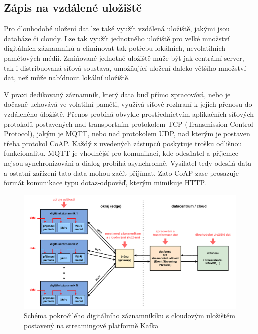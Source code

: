 \subsection{Zápis na vzdálené uložiště}
\label{zapis_na_vzdalene_uloziste}
Pro dlouhodobé uložení dat lze také využít vzdálená uložiště, jakými jsou databáze či cloudy. Lze tak využít jednotného uložiště pro velké množství digitálních záznamníků a eliminovat tak potřebu lokálních, nevolatilních paměťových médií. Zmiňované jednotné uložiště může být jak centrální server, tak i distribuovaná síťová soustava, umožňující uložení daleko většího množství dat, než může nabídnout lokální uložiště.

V praxi dedikovaný záznamník, který data buď přímo zpracovává, nebo je dočasně uchovává ve volatilní paměti, využívá síťové rozhraní k jejich přenosu do vzdáleného úložiště. Přenos probíhá obvykle prostřednictvím aplikačních síťových protokolů postavených nad transportním protokolem TCP (Transmission Control Protocol), jakým je MQTT, nebo nad protokolem UDP, nad kterým je postaven třeba protokol CoAP. Každý z uvedených zástupců poskytuje trošku odlišnou funkcionalitu. MQTT je vhodnější pro komunikaci, kde odesílatel a příjemce nejsou synchronizováni a dialog probíhá asynchronně. Vysílatel tedy odesílá data a ostatní zařízení tato data mohou začít přijímat. Zato CoAP zase prosazuje formát komunikace typu dotaz-odpověď, kterým mimikuje HTTP. \cite{emq_mqtt_vs_coap}


\begin{figure}[h]
    \centering
    \includegraphics[width=1.00\textwidth]{obrazky-figures/advanced_architecture_of_datalogging.pdf}
    
    \caption{Schéma pokročilého digitálního záznamníkíku s cloudovým uložištěm postavený na streamingové platformě Kafka \cite{confluent_advanced_datalogging, influxdata_advanced_datalogging_mmqt}}
    \label{fig:advanced-architecture-of-datalogging}
\end{figure}

